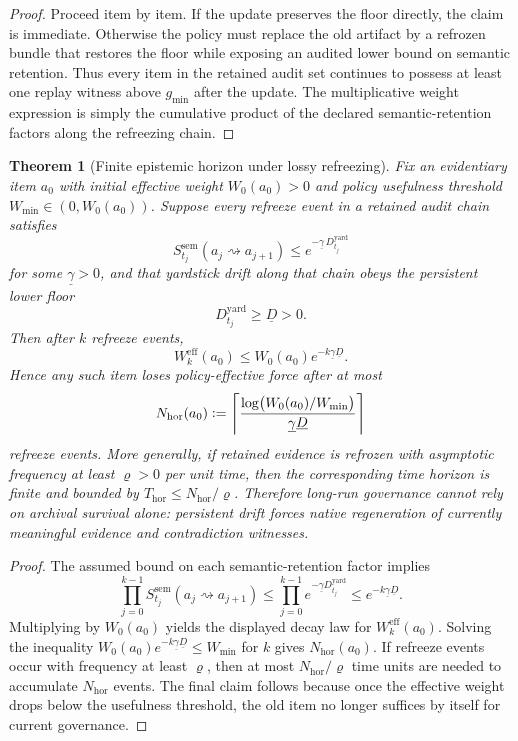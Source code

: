\documentclass[11pt]{article}
\newtheorem{theorem}{Theorem}[section]
\theoremstyle{definition}
\newcommand{\1}{\mathbf{1}}
\newcommand{\Defeq}{\vcentcolon=}
\begin{document}
\begin{proof}
Proceed item by item. If the update preserves the floor directly, the claim is immediate. Otherwise the policy must replace the old artifact by a refrozen bundle that restores the floor while exposing an audited lower bound on semantic retention. Thus every item in the retained audit set continues to possess at least one replay witness above $g_{\min}$ after the update. The multiplicative weight expression is simply the cumulative product of the declared semantic-retention factors along the refreezing chain.
\end{proof}

\begin{theorem}[Finite epistemic horizon under lossy refreezing]\label{thm:finite_horizon}
Fix an evidentiary item $a_0$ with initial effective weight $W_0(a_0)>0$ and policy usefulness threshold $W_{\min}\in(0,W_0(a_0))$. Suppose every refreeze event in a retained audit chain satisfies
\[
S_{t_j}^{\mathrm{sem}}(a_j\rightsquigarrow a_{j+1}) \le e^{-\underline\gamma\,D_{t_j}^{\mathrm{yard}}}
\]
for some $\underline\gamma>0$, and that yardstick drift along that chain obeys the persistent lower floor
\[
D_{t_j}^{\mathrm{yard}}\ge \underline D>0.
\]
Then after $k$ refreeze events,
\[
W_k^{\mathrm{eff}}(a_0)
\le
W_0(a_0)e^{-k\underline\gamma\underline D}.
\]
Hence any such item loses policy-effective force after at most
\[
N_{\mathrm{hor}}(a_0)
\Defeq
\left\lceil\frac{\log\bigl(W_0(a_0)/W_{\min}\bigr)}{\underline\gamma\underline D}\right\rceil
\]
refreeze events. More generally, if retained evidence is refrozen with asymptotic frequency at least $\varrho>0$ per unit time, then the corresponding time horizon is finite and bounded by $T_{\mathrm{hor}}\le N_{\mathrm{hor}}/\varrho$. Therefore long-run governance cannot rely on archival survival alone: persistent drift forces native regeneration of currently meaningful evidence and contradiction witnesses.
\end{theorem}

\begin{proof}
The assumed bound on each semantic-retention factor implies
\[
\prod_{j=0}^{k-1}S_{t_j}^{\mathrm{sem}}(a_j\rightsquigarrow a_{j+1})
\le
\prod_{j=0}^{k-1} e^{-\underline\gamma D_{t_j}^{\mathrm{yard}}}
\le
e^{-k\underline\gamma\underline D}.
\]
Multiplying by $W_0(a_0)$ yields the displayed decay law for $W_k^{\mathrm{eff}}(a_0)$. Solving the inequality $W_0(a_0)e^{-k\underline\gamma\underline D}\le W_{\min}$ for $k$ gives $N_{\mathrm{hor}}(a_0)$. If refreeze events occur with frequency at least $\varrho$, then at most $N_{\mathrm{hor}}/\varrho$ time units are needed to accumulate $N_{\mathrm{hor}}$ events. The final claim follows because once the effective weight drops below the usefulness threshold, the old item no longer suffices by itself for current governance.
\end{proof}
\end{document}
